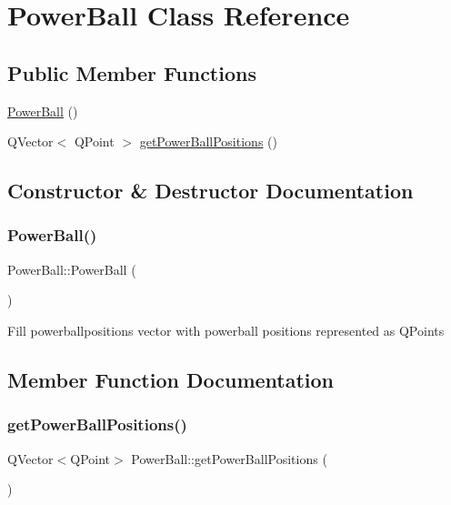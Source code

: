 \hypertarget{class_power_ball}{}\section{Power\+Ball Class Reference}
\label{class_power_ball}
\subsection*{Public Member Functions}
\begin{DoxyCompactItemize}
\item 
\mbox{\hyperlink{class_power_ball_a302335590af74067ed44079a4b475760}{Power\+Ball}} ()
\item 
Q\+Vector$<$ Q\+Point $>$ \mbox{\hyperlink{class_power_ball_a47a928407c16b40cff53eaa96cbdb213}{get\+Power\+Ball\+Positions}} ()
\end{DoxyCompactItemize}


\subsection{Constructor \& Destructor Documentation}
\mbox{\label{class_power_ball_a302335590af74067ed44079a4b475760}} 
\subsubsection{\texorpdfstring{Power\+Ball()}{PowerBall()}}
{\footnotesize\ttfamily Power\+Ball\+::\+Power\+Ball (\begin{DoxyParamCaption}{ }\end{DoxyParamCaption})}

Fill powerballpositions vector with powerball positions represented as Q\+Points 

\subsection{Member Function Documentation}
\mbox{\label{class_power_ball_a47a928407c16b40cff53eaa96cbdb213}} 
\subsubsection{\texorpdfstring{get\+Power\+Ball\+Positions()}{getPowerBallPositions()}}
{\footnotesize\ttfamily Q\+Vector$<$Q\+Point$>$ Power\+Ball\+::get\+Power\+Ball\+Positions (\begin{DoxyParamCaption}{ }\end{DoxyParamCaption})\hspace{0.3cm}{\ttfamily [inline]}}

